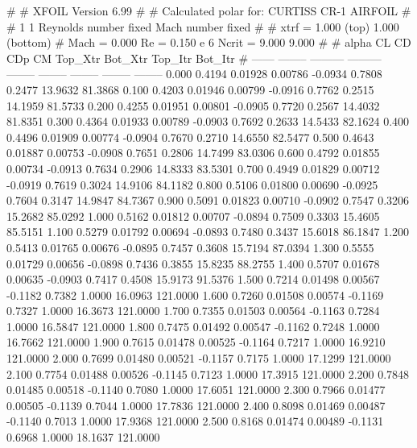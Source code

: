 #  
#       XFOIL         Version 6.99
#  
# Calculated polar for: CURTISS CR-1 AIRFOIL                            
#  
# 1 1 Reynolds number fixed          Mach number fixed         
#  
# xtrf =   1.000 (top)        1.000 (bottom)  
# Mach =   0.000     Re =     0.150 e 6     Ncrit =   9.000  9.000
#  
#   alpha    CL        CD       CDp       CM     Top_Xtr  Bot_Xtr  Top_Itr  Bot_Itr
#  ------ -------- --------- --------- -------- -------- -------- -------- --------
   0.000   0.4194   0.01928   0.00786  -0.0934   0.7808   0.2477  13.9632  81.3868
   0.100   0.4203   0.01946   0.00799  -0.0916   0.7762   0.2515  14.1959  81.5733
   0.200   0.4255   0.01951   0.00801  -0.0905   0.7720   0.2567  14.4032  81.8351
   0.300   0.4364   0.01933   0.00789  -0.0903   0.7692   0.2633  14.5433  82.1624
   0.400   0.4496   0.01909   0.00774  -0.0904   0.7670   0.2710  14.6550  82.5477
   0.500   0.4643   0.01887   0.00753  -0.0908   0.7651   0.2806  14.7499  83.0306
   0.600   0.4792   0.01855   0.00734  -0.0913   0.7634   0.2906  14.8333  83.5301
   0.700   0.4949   0.01829   0.00712  -0.0919   0.7619   0.3024  14.9106  84.1182
   0.800   0.5106   0.01800   0.00690  -0.0925   0.7604   0.3147  14.9847  84.7367
   0.900   0.5091   0.01823   0.00710  -0.0902   0.7547   0.3206  15.2682  85.0292
   1.000   0.5162   0.01812   0.00707  -0.0894   0.7509   0.3303  15.4605  85.5151
   1.100   0.5279   0.01792   0.00694  -0.0893   0.7480   0.3437  15.6018  86.1847
   1.200   0.5413   0.01765   0.00676  -0.0895   0.7457   0.3608  15.7194  87.0394
   1.300   0.5555   0.01729   0.00656  -0.0898   0.7436   0.3855  15.8235  88.2755
   1.400   0.5707   0.01678   0.00635  -0.0903   0.7417   0.4508  15.9173  91.5376
   1.500   0.7214   0.01498   0.00567  -0.1182   0.7382   1.0000  16.0963 121.0000
   1.600   0.7260   0.01508   0.00574  -0.1169   0.7327   1.0000  16.3673 121.0000
   1.700   0.7355   0.01503   0.00564  -0.1163   0.7284   1.0000  16.5847 121.0000
   1.800   0.7475   0.01492   0.00547  -0.1162   0.7248   1.0000  16.7662 121.0000
   1.900   0.7615   0.01478   0.00525  -0.1164   0.7217   1.0000  16.9210 121.0000
   2.000   0.7699   0.01480   0.00521  -0.1157   0.7175   1.0000  17.1299 121.0000
   2.100   0.7754   0.01488   0.00526  -0.1145   0.7123   1.0000  17.3915 121.0000
   2.200   0.7848   0.01485   0.00518  -0.1140   0.7080   1.0000  17.6051 121.0000
   2.300   0.7966   0.01477   0.00505  -0.1139   0.7044   1.0000  17.7836 121.0000
   2.400   0.8098   0.01469   0.00487  -0.1140   0.7013   1.0000  17.9368 121.0000
   2.500   0.8168   0.01474   0.00489  -0.1131   0.6968   1.0000  18.1637 121.0000
